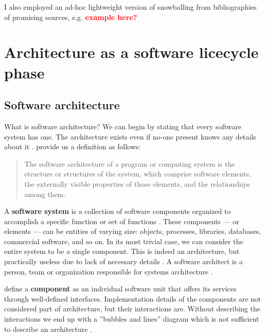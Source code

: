 \documentclass[utf8,english]{gradu3}
\newcommand{\todo}[1]{\textbf{\textcolor{red}{#1}}}
\begin{document}
I also employed an ad-hoc lightweight version of snowballing from bibliographies of
promising sources, e.g. \todo{example here?}

\section{Architecture as a software licecycle phase}

\subsection{Software architecture}

What is software architecture? We can begin by stating that every software
system has one. The architecture exists even if no-one present knows any details
about it \parencite[24]{Bass1998}. \textcite[23]{Bass1998} provide us a
definition as follows:

\begin{quote}
  The software architecture of a program or computing system is the structure or
  structures of the system, which comprise software elements, the externally
  visible properties of those elements, and the relationships among them.
\end{quote}

A \textbf{software system} is a collection of software components organized to accomplish
a specific function or set of functions \parencite[3]{IEEE42010}. These components --- or
elements --- can be entities of varying size: objects, processes, libraries,
databases, commercial software, and so on. In its most trivial case, we can
consider the entire system to be a single component. This is indeed an
architecture, but practically useless due to lack of necessary details
\parencite[24]{Bass1998}. A software architect is a person, team or organization
responsible for systems architecture \parencite[3]{IEEE42010}.

\textcite[53]{Koskimies2005} define a \textbf{component} as an individual software
unit that offers its services through well-defined interfaces. Implementation
details of the components are not considered part of architecture, but their
interactions are. Without describing the interactions we end up with a ''bubbles
and lines'' diagram which is not sufficient to describe an architecture
\parencite[24]{Bass1998}.
\end{document}
